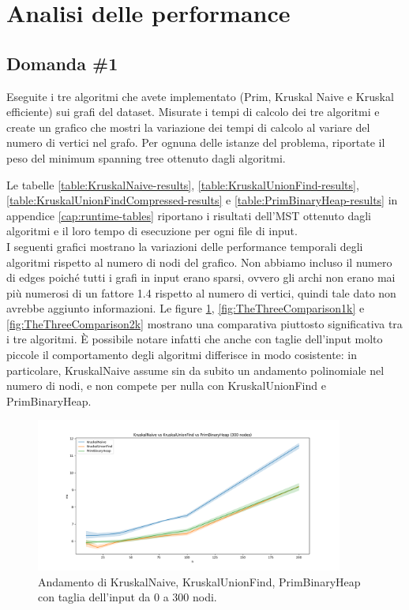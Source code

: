 \section{Analisi delle performance}
\label{cap:performance-analysis}

\subsection{Domanda \#1}

\begin{displayquote}
Eseguite i tre algoritmi che avete implementato (Prim, Kruskal Naive e Kruskal efficiente) sui grafi del dataset. Misurate i tempi di calcolo dei tre algoritmi e create un grafico che mostri la variazione dei tempi di calcolo al variare del numero di vertici nel grafo. Per ognuna delle istanze del problema, riportate il peso del minimum spanning tree ottenuto dagli algoritmi.
\end{displayquote}

\noindent Le tabelle \ref{table:KruskalNaive-results},
 \ref{table:KruskalUnionFind-results}, \ref{table:KruskalUnionFindCompressed-results}
 e \ref{table:PrimBinaryHeap-results} in appendice \ref{cap:runtime-tables} riportano i risultati dell'MST ottenuto dagli algoritmi e il loro tempo di esecuzione per ogni file di input. \\

\noindent I seguenti grafici mostrano la variazioni delle performance temporali degli algoritmi rispetto al numero di nodi del grafico. Non abbiamo incluso il numero di edges poiché tutti i grafi in input erano sparsi, ovvero gli archi non erano mai più numerosi di un fattore 1.4 rispetto al numero di vertici, quindi tale dato non avrebbe aggiunto informazioni. Le figure \ref{fig:TheThreeComparison300}, \ref{fig:TheThreeComparison1k}
e \ref{fig:TheThreeComparison2k} mostrano una comparativa piuttosto significativa tra i tre algoritmi.
È possibile notare infatti che anche con taglie dell'input molto piccole il comportamento degli
algoritmi differisce in modo cosistente: in particolare, KruskalNaive assume sin da subito un
andamento polinomiale nel numero di nodi, e non compete per nulla con KruskalUnionFind e PrimBinaryHeap.

\begin{figure}[H]
    \centering
    \includegraphics[width=0.9\textwidth]{./images/KruskalNaive_vs_KruskalUnionFind_vs_PrimBinaryHeap_(300_nodes).png}
	\caption{Andamento di KruskalNaive, KruskalUnionFind, PrimBinaryHeap con taglia dell'input da 0 a 300 nodi.}
    \label{fig:TheThreeComparison300}
\end{figure}

